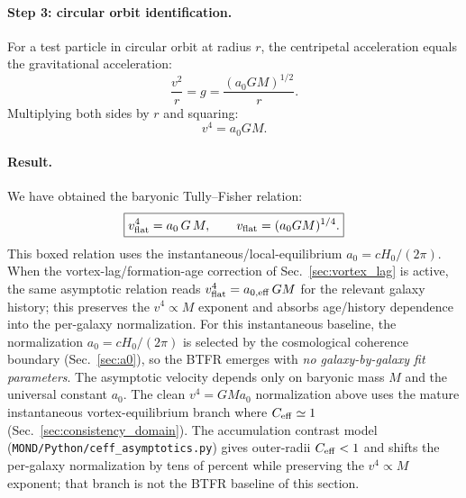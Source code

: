 \documentclass[11pt]{article}
\begin{document}
\paragraph{Step 3: circular orbit identification.}
For a test particle in circular orbit at radius $r$, the centripetal acceleration equals the gravitational acceleration:
\begin{equation}
\frac{v^2}{r} = g = \frac{(a_0 GM)^{1/2}}{r}.
\label{eq:circular}
\end{equation}
Multiplying both sides by $r$ and squaring:
\begin{equation}
v^4 = a_0 GM.
\label{eq:btfr_derived}
\end{equation}

\paragraph{Result.}
We have obtained the baryonic Tully--Fisher relation:
\begin{equation}
\boxed{v_{\rm flat}^4 = a_0 \, G \, M, \qquad v_{\rm flat} = (a_0 GM)^{1/4}.}
\label{eq:btfr_result}
\end{equation}
This boxed relation uses the instantaneous/local-equilibrium
$a_0=cH_0/(2\pi)$.  When the vortex-lag/formation-age
correction of Sec.~\ref{sec:vortex_lag} is active, the same
asymptotic relation reads $v_{\rm flat}^4=a_{0,{\rm eff}}\,GM$
for the relevant galaxy history; this preserves the
$v^4\propto M$ exponent and absorbs age/history dependence into
the per-galaxy normalization.  For this instantaneous baseline,
the normalization $a_0 = cH_0/(2\pi)$ is selected by the
cosmological coherence boundary (Sec.~\ref{sec:a0}), so the BTFR
emerges with \emph{no galaxy-by-galaxy fit parameters}.  The
asymptotic velocity depends only on baryonic mass $M$ and the
universal constant $a_0$.
The clean $v^4=GMa_0$ normalization above uses the mature
instantaneous vortex-equilibrium branch where
$C_{\rm eff}\simeq1$ (Sec.~\ref{sec:consistency_domain}).  The
accumulation contrast model
(\texttt{MOND/Python/ceff\_asymptotics.py}) gives outer-radii
$C_{\rm eff}<1$ and shifts the per-galaxy normalization by tens of
percent while preserving the $v^4\propto M$ exponent; that branch
is not the BTFR baseline of this section.
\end{document}
